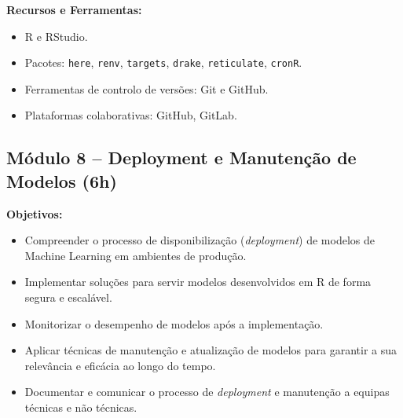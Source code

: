 \documentclass[12pt]{article}
\begin{document}
\textbf{Recursos e Ferramentas:}
\begin{itemize}
  \item R e RStudio.
  \item Pacotes: \texttt{here}, \texttt{renv}, \texttt{targets}, \texttt{drake}, \texttt{reticulate}, \texttt{cronR}.
  \item Ferramentas de controlo de versões: Git e GitHub.
  \item Plataformas colaborativas: GitHub, GitLab.
\end{itemize}

\subsection*{Módulo 8 – Deployment e Manutenção de Modelos (6h)}

\textbf{Objetivos:}
\begin{itemize}
  \item Compreender o processo de disponibilização (\textit{deployment}) de modelos de Machine Learning em ambientes de produção.
  \item Implementar soluções para servir modelos desenvolvidos em R de forma segura e escalável.
  \item Monitorizar o desempenho de modelos após a implementação.
  \item Aplicar técnicas de manutenção e atualização de modelos para garantir a sua relevância e eficácia ao longo do tempo.
  \item Documentar e comunicar o processo de \textit{deployment} e manutenção a equipas técnicas e não técnicas.
\end{itemize}
\end{document}
